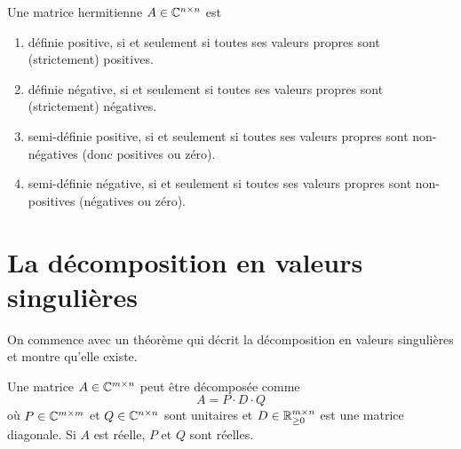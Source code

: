 \begin{theorem}
\label{thr:20}
  Une matrice hermitienne $A \in \mathbb{C}^{n \times n}$ est 
  \begin{enumerate}
  \item définie positive,
    si et seulement si toutes ses valeurs propres sont (strictement) positives. 
  \item définie négative,  si et seulement si toutes ses valeurs propres sont (strictement) négatives. 
  \item semi-définie positive, si et seulement si toutes ses valeurs propres sont non-négatives (donc positives ou zéro).  
  \item semi-définie négative, si et seulement si toutes ses valeurs propres sont non-positives (négatives ou zéro).  
  \end{enumerate}
\end{theorem}


\section{La décomposition en valeurs singulières}
\label{sec:la-decomposition-en}


On commence avec un théorème qui décrit la décomposition en valeurs singulières et montre qu'elle existe. 


\begin{theorem}
  \label{thr:21}
  Une matrice $A \in \mathbb{C}^{m \times n}$ peut être décomposée comme 
  \begin{displaymath}
    A = P\cdot D \cdot Q
  \end{displaymath}
où $P \in \mathbb{C}^{m \times m}$ et $Q \in \mathbb{C}^{n \times n}$ sont unitaires et $D \in \mathbb{R}_{\geq 0}^{m \times n}$ est une matrice diagonale. Si $A$ est réelle, $P$ et $Q$ sont réelles. 
\end{theorem}


